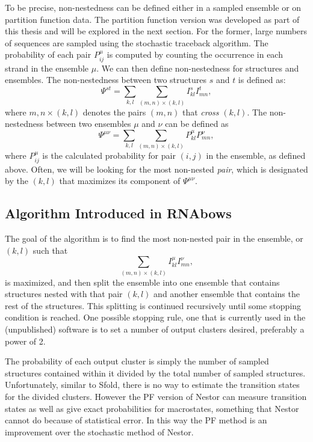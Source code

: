 To be precise, non-nestedness can be defined either in a sampled
ensemble or on partition function data. The partition function version
was developed as part of this thesis and will be explored in the next
section. For the former, large numbers of sequences are sampled using
the stochastic traceback algorithm. The probability of each pair
$P^\mu_{ij}$ is computed by counting the occurrence in each strand in
the ensemble $\mu$. We can then define non-nestedness for structures
and ensembles. The non-nestedness between two structures $s$ and $t$
is defined as:
\begin{equation}
\Psi^{st} = \sum_{k,l} \sum_{(m,n) \times (k,l)} I^{s}_{kl}
I^{t}_{mn},
\end{equation}
where $m,n \times (k,l)$ denotes the pairs $(m,n)$ that \emph{cross}
$(k,l)$. The non-nestedness between two ensembles $\mu$ and $\nu$ can
be defined as
\begin{equation}
\Psi^{\mu\nu} = \sum_{k,l} \sum_{(m,n) \times (k,l)} P^{\mu}_{kl}
P^{\nu}_{mn},
\end{equation}
where $P^\mu_{ij}$ is the calculated probability for pair $(i,j)$ in
the ensemble, as defined above. Often, we will be looking for the most
non-nested \emph{pair}, which is designated by the $(k,l)$ that
maximizes its component of $\Psi^{\mu\nu}$.


\subsection{Algorithm Introduced in RNAbows}

The goal of the algorithm is to find the most non-nested pair in the
ensemble, or $(k,l)$ such that
\begin{equation}
\sum_{(m,n) \times (k,l)} I^\mu_{kl}I^\nu_{mn},
\end{equation}
is maximized, and then split the ensemble into one ensemble that
contains structures nested with that pair $(k,l)$ and another ensemble
that contains the rest of the structures. This splitting is continued
recursively until some stopping condition is reached. One possible
stopping rule, one that is currently used in the (unpublished)
software is to set a number of output clusters desired, preferably a
power of 2.

The probability of each output cluster is simply the number of sampled
structures contained within it divided by the total number of sampled
structures. Unfortunately, similar to Sfold, there is no way to
estimate the transition states for the divided clusters. However the
PF version of Nestor can measure transition states as well as give
exact probabilities for macrostates, something that Nestor cannot do
because of statistical error. In this way the PF method is an
improvement over the stochastic method of Nestor.

